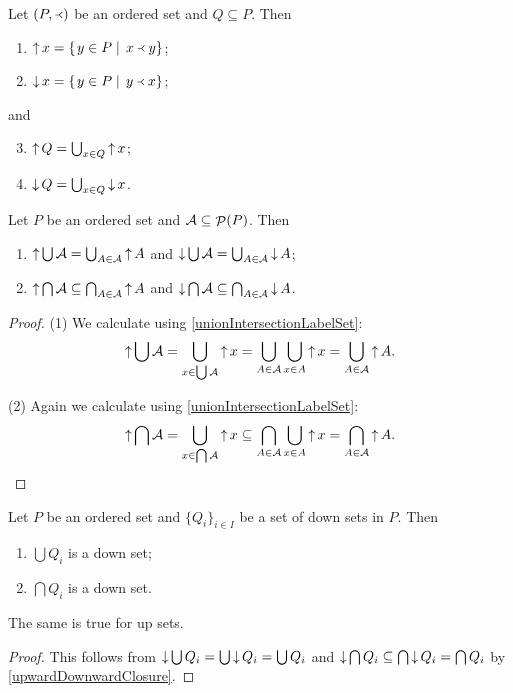 \begin{lemma}
Let $\left( P, \Yleft \right)$ be an ordered set and $Q\subseteq P$. Then
\begin{enumerate}
\item $\mathop{\uparrow} x = \left\{\left. y\in P \;\right|\; x\Yleft y \right\}$;
\item $\mathop{\downarrow} x = \left\{\left. y\in P \;\right|\; y\Yleft x \right\}$;
\end{enumerate}
and
\begin{enumerate} \setcounter{enumi}{2}
\item $\mathop{\uparrow} Q = \bigcup_{x\in Q} \mathop{\uparrow} x$;
\item $\mathop{\downarrow} Q = \bigcup_{x\in Q} \mathop{\downarrow} x$.
\end{enumerate}
\end{lemma}
\begin{corollary} \label{upDownsetUnionIntersection}
Let $P$ be an ordered set and $\mathcal{A}\subseteq \mathop{\mathcal{P}}(P)$. Then
\begin{enumerate}
\item $\mathop{\uparrow} \bigcup \mathcal{A} = \bigcup_{A\in \mathcal{A}} \mathop{\uparrow} A$ and $\mathop{\downarrow} \bigcup \mathcal{A} = \bigcup_{A\in \mathcal{A}} \mathop{\downarrow} A$;
\item $\mathop{\uparrow} \bigcap \mathcal{A} \subseteq \bigcap_{A\in \mathcal{A}} \mathop{\uparrow} A$ and $\mathop{\downarrow} \bigcap \mathcal{A} \subseteq \bigcap_{A\in \mathcal{A}} \mathop{\downarrow} A$.
\end{enumerate}
\end{corollary}
\begin{proof}
(1) We calculate using \ref{unionIntersectionLabelSet}:
\[ \mathop{\uparrow} \bigcup \mathcal{A} = \bigcup_{x\in \bigcup\mathcal{A}} \mathop{\uparrow} x = \bigcup_{A\in \mathcal{A}}\bigcup_{x\in A}\mathop{\uparrow} x = \bigcup_{A\in \mathcal{A}} \mathop{\uparrow} A. \]

(2) Again we calculate using \ref{unionIntersectionLabelSet}:
\[ \mathop{\uparrow} \bigcap \mathcal{A} = \bigcup_{x\in \bigcap\mathcal{A}} \mathop{\uparrow} x \subseteq \bigcap_{A\in \mathcal{A}}\bigcup_{x\in A}\mathop{\uparrow} x = \bigcap_{A\in \mathcal{A}} \mathop{\uparrow} A. \]
\end{proof}
\begin{corollary} \label{unionIntersectionDownUpSets}
Let $P$ be an ordered set and $\{Q_i\}_{i\in I}$ be a set of down sets in $P$. Then
\begin{enumerate}
\item $\bigcup Q_i$ is a down set;
\item $\bigcap Q_i$ is a down set.
\end{enumerate}
The same is true for up sets.
\end{corollary}
\begin{proof}
This follows from $\mathop{\downarrow} \bigcup Q_i = \bigcup \mathop{\downarrow} Q_i = \bigcup Q_i$ and $\mathop{\downarrow} \bigcap Q_i \subseteq \bigcap \mathop{\downarrow} Q_i = \bigcap Q_i$ by \ref{upwardDownwardClosure}.
\end{proof}


